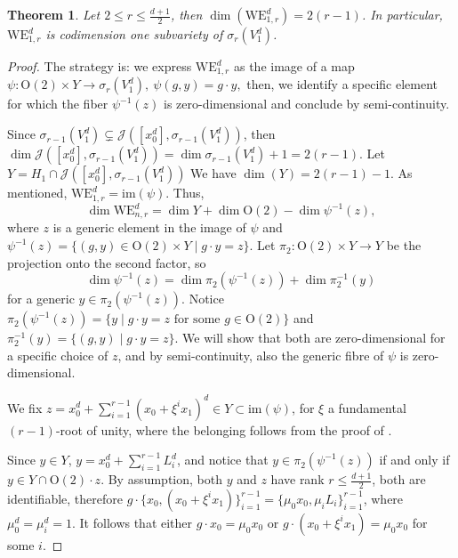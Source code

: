 \documentclass{amsart}
\newtheorem{theorem}{Theorem}
\numberwithin{theorem}{section}
\theoremstyle{definition}
\begin{document}
\begin{theorem}\label{proposition: dim WE rnc }
    Let $2\leq r\leq \frac{d+1}{2}$, then $\dim(\mathrm{WE}_{1,r}^d)=2(r-1)$. In particular, $\mathrm{WE}_{1,r}^d$ is codimension one subvariety of $\sigma_r(V_1^d)$.
\end{theorem}
\begin{proof}
    {The strategy is: we express $\mathrm{WE}^d_{1,r}$ as the image of a map 
    $
        \psi:\mathrm{O}(2)\times Y\to \sigma_r(V_1^d),\ \psi(g,y)=g\cdot y,
    $
    then, we identify a specific element for which the fiber $\psi^{-1}(z)$ is zero-dimensional and conclude by semi-continuity.}
    
    Since $\sigma_{r-1}(V_1^d)\subsetneq\mathcal J([x_0^d], \sigma_{r-1}(V_1^d))$, then $\dim \mathcal J([x_0^d], \sigma_{r-1}(V_1^d)) = \dim \sigma_{r-1}(V_1^d)+1 = 2(r-1).$ Let $Y=H_1\cap \mathcal J([x_0^d], \sigma_{r-1}(V_1^d))$ We have $\dim(Y)=2(r-1)-1$.
    As mentioned, $\mathrm{WE}_{1,r}^d=\mathrm{im}(\psi)$. Thus, $$\dim \mathrm{WE}_{n,r}^d=\dim Y+\dim \mathrm{O}(2)-\dim \psi^{-1}(z),$$ where $z$ is a generic element in the image of $\psi$ and $\psi^{-1}(z)=\{(g,y)\in \mathrm{O}(2)\times Y\mid g\cdot y=z\}$. Let $\pi_2:\mathrm{O}(2)\times Y\to Y$ be the projection onto the second factor, so $$\dim \psi^{-1}(z)=\dim \pi_2(\psi^{-1}(z))+\dim \pi_2^{-1}(y)$$ for a generic $y\in \pi_2(\psi^{-1}(z))$. Notice $\pi_2(\psi^{-1}(z))=\{y\mid g\cdot y=z \text{ for some $g\in\mathrm{O}(2)$}\}$ and $\pi_2^{-1}(y)=\{(g,y)\mid g\cdot y=z\}$. We will show that both are zero-dimensional for a specific choice of $z$, and by semi-continuity, also the generic fibre of $\psi$ is zero-dimensional. 
    
    We fix $z=x_0^d+\sum_{i=1}^{r-1}(x_0+\xi^ix_1)^d\in Y\subset \mathrm{im}(\psi)$, for $\xi$ a fundamental $(r-1)$-root of unity, where the belonging follows from the proof of .

    Since $y\in Y$, $y=x_0^d+\sum_{i=1}^{r-1}L_i^d$, and notice that $y\in \pi_2(\psi^{-1}(z))$ if and only if $y\in Y\cap \mathrm{O}(2)\cdot z$. By assumption, both $y$ and $z$ have rank $r\leq \frac{d+1}{2}$, both are identifiable, therefore $g\cdot\{ x_0,(x_0+\xi^ix_1)\}_{i=1}^{r-1}=\{\mu_0 x_0,\mu_iL_i\}_{i=1}^{r-1}$, where $\mu_0^d=\mu_i^d=1$. It follows that either $g\cdot x_0=\mu_0 x_0$ or $g\cdot (x_0+\xi^ix_1)=\mu_0x_0$ for some $i$. 


\end{proof}
\end{document}
